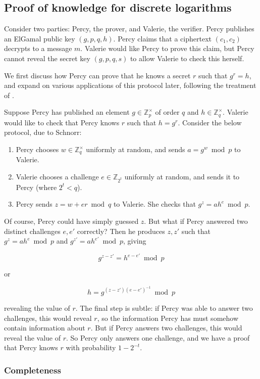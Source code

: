 \documentclass[11pt,twoside,a4paper]{article}
\theoremstyle{definition}
\begin{document}
\subsection{Proof of knowledge for discrete logarithms}
Consider two parties: Percy, the prover, and Valerie, the verifier. Percy publishes an ElGamal public key \((g,p,q,h)\). Percy claims that a ciphertext \((c_1, c_2)\) decrypts to a message \(m\). Valerie would like Percy to prove this claim, but Percy cannot reveal the secret key \((g,p,q,s)\) to allow Valerie to check this herself.

We first discuss how Percy can prove that he knows a secret \(r\) such that \(g^r=h\), and expand on various applications of this protocol later, following the treatment of \cite{damgaard2002sigma}.

Suppose Percy has published an element \(g\in\mathbb{Z}^\times_p\) of order \(q\) and \(h\in\mathbb{Z}^\times_q\). Valerie would like to check that Percy knows \(r\) such that \(h=g^r\). Consider the below protocol, due to Schnorr:
\begin{enumerate}
    \item Percy chooses \(w\in\mathbb{Z}^\times_q\) uniformly at random, and sends \(a=g^w\bmod p\) to Valerie.
    \item Valerie chooses a challenge \(e\in\mathbb{Z}_{2^t}\) uniformly at random, and sends it to Percy (where \(2^t<q\)).
    \item Percy sends \(z=w+er\bmod q\) to Valerie. She checks that \(g^z=ah^e\bmod p\).
\end{enumerate}

Of course, Percy could have simply guessed \(z\). But what if Percy answered two distinct challenges \(e,e'\) correctly? Then he produces \(z,z'\) such that \(g^z=ah^e\bmod p\) and \(g^{z'}=ah^{e'}\bmod p\), giving

\[g^{z-z'}=h^{e-e'}\bmod p\]

or

\[h=g^{(z-z')(e-e')^{-1}}\bmod p\]

revealing the value of \(r\). The final step is subtle: if Percy was able to answer two challenges, this would reveal \(r\), so the information Percy has must somehow contain information about \(r\). But if Percy answers two challenges, this would reveal the value of \(r\). So Percy only answers one challenge, and we have a proof that Percy knows \(r\) with probability \(1-2^{-t}\).

\subsubsection{Completeness}
\end{document}
